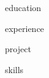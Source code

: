 \documentclass{resume} %
\begin{document}




{education}





{experience}

{project}

{skills}



\end{document}
